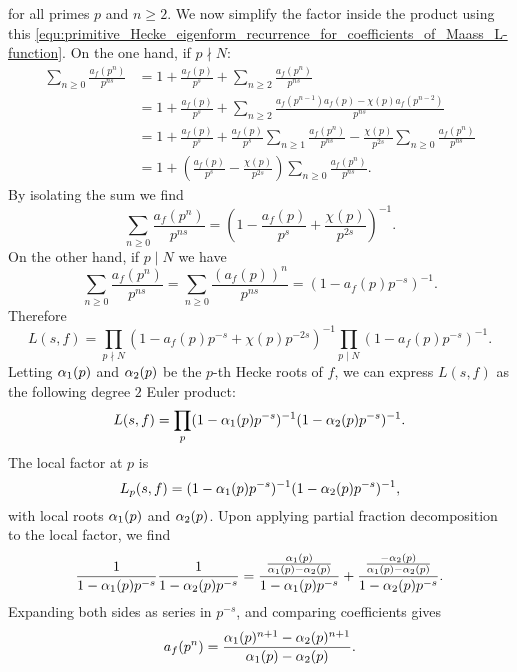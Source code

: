       for all primes $p$ and $n \ge 2$. We now simplify the factor inside the product using this \cref{equ:primitive_Hecke_eigenform_recurrence_for_coefficients_of_Maass_L-function}. On the one hand, if $p \nmid N$:
      \begin{align*}
        \sum_{n \ge 0}\frac{a_{f}(p^{n})}{p^{ns}} &= 1+\frac{a_{f}(p)}{p^{s}}+\sum_{n \ge 2}\frac{a_{f}(p^{n})}{p^{ns}} \\
        &= 1+\frac{a_{f}(p)}{p^{s}}+\sum_{n \ge 2}\frac{a_{f}(p^{n-1})a_{f}(p)-\chi(p)a_{f}(p^{n-2})}{p^{ns}} \\
        &= 1+\frac{a_{f}(p)}{p^{s}}+\frac{a_{f}(p)}{p^{s}}\sum_{n \ge 1}\frac{a_{f}(p^{n})}{p^{ns}}-\frac{\chi(p)}{p^{2s}}\sum_{n \ge 0}\frac{a_{f}(p^{n})}{p^{ns}} \\
        &= 1+\left(\frac{a_{f}(p)}{p^{s}}-\frac{\chi(p)}{p^{2s}}\right)\sum_{n \ge 0}\frac{a_{f}(p^{n})}{p^{ns}}.
      \end{align*}
      By isolating the sum we find
      \[
        \sum_{n \ge 0}\frac{a_{f}(p^{n})}{p^{ns}} = \left(1-\frac{a_{f}(p)}{p^{s}}+\frac{\chi(p)}{p^{2s}}\right)^{-1}.
      \]
      On the other hand, if $p \mid N$ we have
      \[
        \sum_{n \ge 0}\frac{a_{f}(p^{n})}{p^{ns}} = \sum_{n \ge 0}\frac{(a_{f}(p))^{n}}{p^{ns}} = \left(1-a_{f}(p)p^{-s}\right)^{-1}.
      \]
      Therefore
      \[
        L(s,f) = \prod_{p \nmid N}(1-a_{f}(p)p^{-s}+\chi(p)p^{-2s})^{-1}\prod_{p \mid N}(1-a_{f}(p)p^{-s})^{-1}.
      \]
      Letting $\alpha_{1}(p)$ and $\alpha_{2}(p)$ be the $p$-th Hecke roots of $f$, we can express $L(s,f)$ as the following degree $2$ Euler product:
      \[
        L(s,f) = \prod_{p}(1-\alpha_{1}(p)p^{-s})^{-1}(1-\alpha_{2}(p)p^{-s})^{-1}.
      \]
      The local factor at $p$ is 
      \[
        L_{p}(s,f) = (1-\alpha_{1}(p)p^{-s})^{-1}(1-\alpha_{2}(p)p^{-s})^{-1},
      \]
      with local roots $\alpha_{1}(p)$ and $\alpha_{2}(p)$. Upon applying partial fraction decomposition to the local factor, we find
      \[
        \frac{1}{1-\alpha_{1}(p)p^{-s}}\frac{1}{1-\alpha_{2}(p)p^{-s}} = \frac{\frac{\alpha_{1}(p)}{\alpha_{1}(p)-\alpha_{2}(p)}}{1-\alpha_{1}(p)p^{-s}}+\frac{\frac{-\alpha_{2}(p)}{\alpha_{1}(p)-\alpha_{2}(p)}}{1-\alpha_{2}(p)p^{-s}}.
      \]
      Expanding both sides as series in $p^{-s}$, and comparing coefficients gives
      \begin{equation}\label{equ:Hecke_Maass_L_function_coefficient_formula}
        a_{f}(p^{n}) = \frac{\alpha_{1}(p)^{n+1}-\alpha_{2}(p)^{n+1}}{\alpha_{1}(p)-\alpha_{2}(p)}.
      \end{equation}
